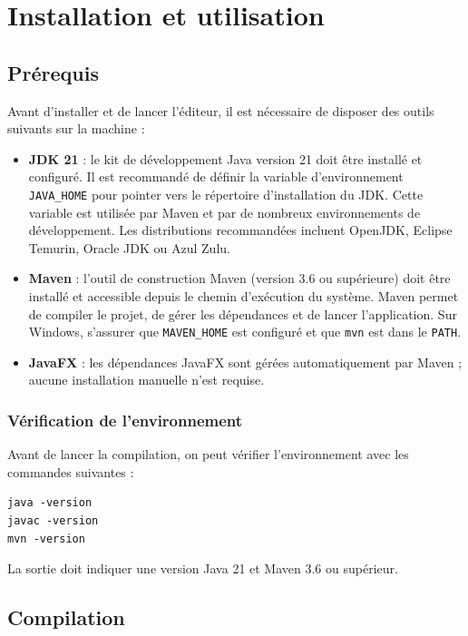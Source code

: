 \documentclass[11pt,twoside,openany]{book}
\begin{document}
\chapter{Installation et utilisation}

\section{Prérequis}

Avant d'installer et de lancer l'éditeur, il est nécessaire de disposer des outils suivants sur la machine :

\begin{itemize}
\item \textbf{JDK 21} : le kit de développement Java version 21 doit être installé et configuré. Il est recommandé de définir la variable d'environnement \texttt{JAVA\_HOME} pour pointer vers le répertoire d'installation du JDK. Cette variable est utilisée par Maven et par de nombreux environnements de développement. Les distributions recommandées incluent OpenJDK, Eclipse Temurin, Oracle JDK ou Azul Zulu.
\item \textbf{Maven} : l'outil de construction Maven (version 3.6 ou supérieure) doit être installé et accessible depuis le chemin d'exécution du système. Maven permet de compiler le projet, de gérer les dépendances et de lancer l'application. Sur Windows, s'assurer que \texttt{MAVEN\_HOME} est configuré et que \texttt{mvn} est dans le \texttt{PATH}.
\item \textbf{JavaFX} : les dépendances JavaFX sont gérées automatiquement par Maven ; aucune installation manuelle n'est requise.
\end{itemize}

\subsection{Vérification de l'environnement}

Avant de lancer la compilation, on peut vérifier l'environnement avec les commandes suivantes :

\begin{verbatim}
java -version
javac -version
mvn -version
\end{verbatim}

La sortie doit indiquer une version Java 21 et Maven 3.6 ou supérieur.

\section{Compilation}
\end{document}
